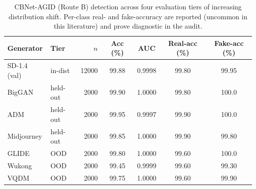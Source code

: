 \begin{table}[t]
  \centering
  \caption{CBNet-AGID (Route B) detection across four evaluation tiers of increasing distribution shift.
  Per-class real- and fake-accuracy are reported (uncommon in this literature) and prove diagnostic in the audit.}
  \label{tab:detection}
  \small
  \begin{tabular}{llrcccc}
    \toprule
    Generator & Tier & $n$ & Acc (\%) & AUC & Real-acc (\%) & Fake-acc (\%) \\
    \midrule
    SD-1.4 (val) & in-dist  & 12000 & 99.88 & 0.9998 & 99.80 & 99.95 \\
    BigGAN       & held-out & 2000  & 99.90 & 1.0000 & 99.80 & 100.0 \\
    ADM          & held-out & 2000  & 99.95 & 0.9997 & 99.90 & 100.0 \\
    Midjourney   & held-out & 2000  & 99.85 & 1.0000 & 99.90 & 99.80 \\
    GLIDE        & OOD      & 2000  & 99.80 & 1.0000 & 99.60 & 100.0 \\
    Wukong       & OOD      & 2000  & 99.45 & 0.9999 & 99.60 & 99.30 \\
    VQDM         & OOD      & 2000  & 99.75 & 1.0000 & 99.60 & 99.90 \\
    \bottomrule
  \end{tabular}
\end{table}
